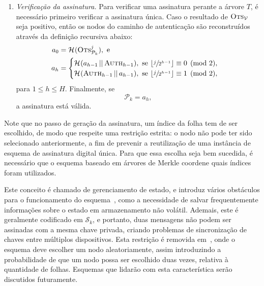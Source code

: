 \documentclass{ufsctex/ufsctex}
\newcommand{\pk}{\mathcal{P}_{k}}
\newcommand{\sk}{\mathcal{S}_{k}}
\newcommand{\hash}[2][]{\mathcal{H}^{#1} (#2)}
\newcommand{\concat}{\, \vert{} \vert{} \,}
\begin{document}
\begin{enumerate}
  \item[] \emph{Verificação da assinatura.} Para verificar uma assinatura
      perante a árvore $T$, é necessário primeiro verificar a assinatura única.
        Caso o resultado de $\textsc{Ots}_{\mathcal{V}}$ seja positivo, então
        os nodos do caminho de autenticação são reconstruídos através da
        definição recursiva abaixo:
        \begin{equation}
          \begin{split}
            a_{0} &= \hash{\textsc{Ots}_{\pk{}}^{j}}, \text{ e } \\
            a_{h} &=
            \begin{cases}
              \hash{a_{h - 1} \concat \textsc{Auth}_{h - 1}}, \text{ se }
                \lfloor \sfrac{j}{2^{h - 1}} \rfloor \equiv 0 \pmod{2}, \\
              \hash{\textsc{Auth}_{h - 1} \concat a_{h - 1}}, \text{ se }
                \lfloor \sfrac{j}{2^{h - 1}} \rfloor \equiv 1 \pmod{2}, \\
            \end{cases}
          \end{split}
        \end{equation}
        para $1 \leq h \leq H$. Finalmente, se
        \begin{equation}
          \pk{} = a_{h},
        \end{equation}
        a assinatura está válida.

\end{enumerate}

Note que no passo de geração da assinatura, um índice da folha tem de ser
escolhido, de modo que respeite uma restrição estrita: o nodo não pode ter sido
selecionado anteriormente, a fim de prevenir a reutilização de uma instância de
esquema de assinatura digital única. Para que essa escolha seja bem sucedida, é
necessário que o esquema baseado em árvores de Merkle coordene quais índices
foram utilizados.

Este conceito é chamado de gerenciamento de estado, e introduz vários
obstáculos para o funcionamento do esquema~\cite{McGrew:inproc:2016:nov}, como
a necessidade de salvar frequentemente informações sobre o estado em
armazenamento não volátil. Ademais, este é geralmente codificado em $\sk{}$, e
portanto, duas mensagens não podem ser assinadas com a mesma chave privada,
criando problemas de sincronização de chaves entre múltiplos dispositivos. Esta
restrição é removida em~\cite[Construção 6.4.16]{Goldreich:book:2004}, onde o
esquema deve escolher um nodo aleatoriamente, assim introduzindo a
probabilidade de que um nodo possa ser escolhido duas vezes, relativa à
quantidade de folhas. Esquemas que lidarão com esta característica serão
discutidos futuramente.
\end{document}
